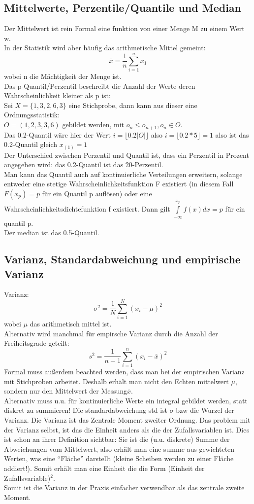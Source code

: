 \documentclass{article}
\begin{document}
	\subsection{Mittelwerte, Perzentile/Quantile und Median}
	Der Mittelwert ist rein Formal eine funktion von einer Menge M zu einem Wert w.\\
	In der Statistik wird aber häufig das arithmetische Mittel gemeint: 
	\[\overline{x} = \frac{1}{n}\sum\limits^n_{i=1} x_1\]
	wobei n die Mächtigkeit der Menge ist.\\
	Das p-Quantil/Perzentil beschreibt die Anzahl der Werte deren Wahrscheinlichkeit kleiner als p ist:\\
	Sei $X=\{1,3,2,6,3\}$ eine Stichprobe, dann kann aus dieser eine Ordnungsstatistik:\\
	$O=(1,2,3,3,6)$ gebildet werden, mit $o_n\leq o_{n+1}, o_n\in O$.\\
	Das 0.2-Quantil wäre hier der Wert $i=\lfloor 0.2|O|\rfloor$ also $i=\lfloor0.2*5\rfloor=1$
	also ist das 0.2-Quantil gleich $x_{(1)}=1$\\
	Der Unterschied zwischen Perzentil und Quantil ist, dass ein Perzentil in Prozent angegeben wird: das 0.2-Quantil ist das 20-Perzentil.\\
	Man kann das Quantil auch auf kontinuierliche Verteilungen erweitern, solange entweder eine stetige Wahrscheinlichkeitsfunktion F existiert (in diesem Fall $F(x_p)=p$ für ein Quantil p auflösen) oder eine Wahrscheinlichkeitsdichtefunktion f existiert. Dann gilt $\int\limits^{x_p}_{-\infty} f(x)dx = p$ für ein quantil p.\\
	Der median ist das 0.5-Quantil.\\
	\subsection{Varianz, Standardabweichung und empirische Varianz}
	Varianz:\\
	\[\sigma^2 = \frac{1}{N}\sum\limits^N_{i=1} (x_i-\mu)^2\] wobei $\mu$ das arithmetisch mittel ist.\\
	Alternativ wird manchmal für empirsche Varianz durch die Anzahl der Freiheitsgrade geteilt:\\
	\[s^2=\frac{1}{n-1}\sum^n_{i=1} (x_i-\overline{x})^2\]
	Formal muss außerdem beachted werden, dass man bei der empirischen Varianz mit Stichproben arbeitet. Deshalb erhält man nicht den Echten mittelwert $\mu$, sondern nur den Mittelwert der Messung$\overline{x}$.\\
	Alternativ muss u.u. für kontinuierliche Werte ein integral gebildet werden, statt diskret zu summieren!
	Die standardabweichung std ist $\sigma$ bzw die Wurzel der Varianz. Die Varianz ist das Zentrale Moment zweiter Ordnung.
	Das problem mit der Varianz selbst, ist das die Einheit anders als die der Zufallsvariablen ist. Dies ist schon an ihrer Definition sichtbar: Sie ist die (u.u. diskrete) Summe der Abweichungen vom Mittelwert, also erhält man eine summe aus gewichteten Werten, was eine ``Fläche'' darstellt (kleine Scheiben werden zu einer Fläche addiert!). Somit erhält man eine Einheit die die Form (Einheit der Zufallsvariable)$^2$.\\
	Somit ist die Varianz in der Praxis einfacher verwendbar als das zentrale zweite Moment.
\end{document}
